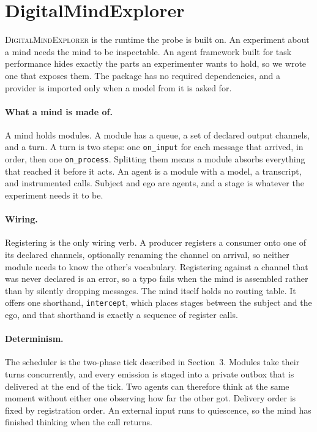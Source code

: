\appendix
\section{DigitalMindExplorer}
\label{app:framework}

\textsc{DigitalMindExplorer} is the runtime the probe is built on. An experiment
about a mind needs the mind to be inspectable. An agent framework built for task
performance hides exactly the parts an experimenter wants to hold, so we wrote
one that exposes them. The package has no required dependencies, and a provider
is imported only when a model from it is asked for.

\paragraph{What a mind is made of.} A mind holds modules. A module has a queue,
a set of declared output channels, and a turn. A turn is two steps: one
\texttt{on\_input} for each message that arrived, in order, then one
\texttt{on\_process}. Splitting them means a module absorbs everything that
reached it before it acts. An agent is a module with a model, a transcript, and
instrumented calls. Subject and ego are agents, and a stage is whatever the
experiment needs it to be.

\paragraph{Wiring.} Registering is the only wiring verb. A producer registers a
consumer onto one of its declared channels, optionally renaming the channel on
arrival, so neither module needs to know the other's vocabulary. Registering
against a channel that was never declared is an error, so a typo fails when the
mind is assembled rather than by silently dropping messages. The mind itself
holds no routing table. It offers one shorthand, \texttt{intercept}, which places
stages between the subject and the ego, and that shorthand is exactly a sequence
of register calls.

\paragraph{Determinism.} The scheduler is the two-phase tick described in
Section~3. Modules take their turns concurrently, and every emission is staged
into a private outbox that is delivered at the end of the tick. Two agents can
therefore think at the same moment without either one observing how far the other
got. Delivery order is fixed by registration order. An external input runs to
quiescence, so the mind has finished thinking when the call returns.

